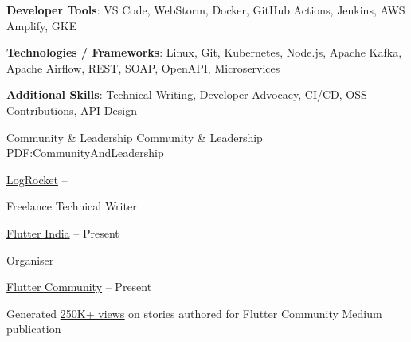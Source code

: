 \documentclass[letterpaper,MMMyyyy,nonstopmode]{simpleresumecv}
\newcommand{\CVNote}{CV compiled on {\today} for Google}
\begin{document}
\begin{Body}
\Gap

\textbf{Developer Tools}: VS Code, WebStorm, Docker, GitHub Actions, Jenkins, AWS Amplify, GKE 

\Gap

\textbf{Technologies / Frameworks}:  Linux, Git, Kubernetes, Node.js, Apache Kafka, Apache Airflow, REST, SOAP, OpenAPI, Microservices 

\Gap

\textbf{Additional Skills}: Technical Writing, Developer Advocacy, CI/CD, OSS Contributions, API Design



\Section
{Community \&\newline
Leadership}
{Community \& Leadership}
{PDF:CommunityAndLeadership}


\Gap
\href{https://blog.logrocket.com/author/himanshusharma/}{LogRocket}
\hfill
{} --
\Gap
\begin{Detail}
Freelance Technical Writer
\end{Detail}

\Gap
\href{https://flutterindia.dev/}{Flutter India}
\hfill
{} -- Present
\Gap
\begin{Detail}
Organiser
\end{Detail}

\Gap
\href{https://medium.com/@himanshusharma89}{Flutter Community}
\hfill
{} -- Present
\Gap
\begin{Detail}
Generated \href{https://medium.com/@himanshusharma89}{\underline{250K+ views}} on stories authored for Flutter Community Medium publication
\end{Detail}

\end{Body}


\end{document}
